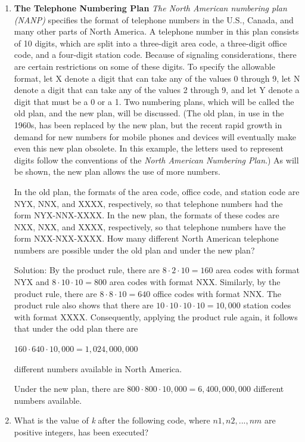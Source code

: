 \documentclass[11pt,a4paper]{book}
\begin{document}
\begin{enumerate}[label=Example~\arabic*]
\item \textbf{The Telephone Numbering Plan} \textit{The North American numbering plan (NANP)} specifies the format of telephone numbers in the U.S., Canada, and many other parts of North America.
A telephone number in this plan consists of 10 digits, which are split into a three-digit area code, a three-digit office code, and a four-digit station code.
Because of signaling considerations, there are certain restrictions on some of these digits.
To specify the allowable format, let X denote a digit that can take any of the values 0 through 9, let N denote a digit that can take any of the values 2 through 9, and let Y denote a digit that must be a 0 or a 1.
Two numbering plans, which will be called the old plan, and the new plan, will be discussed.
(The old plan, in use in the 1960s, has been replaced by the new plan, but the recent rapid growth in demand for new numbers for mobile phones and devices will eventually make even this new plan obsolete.
In this example, the letters used to represent digits follow the conventions of the \textit{North American Numbering Plan}.)
As will be shown, the new plan allows the use of more numbers.

In the old plan, the formats of the area code, office code, and station code are NYX, NNX, and XXXX, respectively, so that telephone numbers had the form NYX-NNX-XXXX.
In the new plan, the formats of these codes are NXX, NXX, and XXXX, respectively, so that telephone numbers have the form NXX-NXX-XXXX. How many different North American telephone numbers are possible under the old plan and under the new plan?

Solution: By the product rule, there are $8 \cdot 2 \cdot 10 = 160$ area codes with format NYX and $8 \cdot 10 \cdot 10 = 800$ area codes with format NXX. 
Similarly, by the product rule, there are $8 \cdot 8 \cdot 10 = 640$ office codes with format NNX.
The product rule also shows that there are $10 \cdot 10 \cdot 10 \cdot 10 = 10,000$ station codes with format XXXX.
Consequently, applying the product rule again, it follows that under the odd plan there are

$160 \cdot 640 \cdot 10,000 = 1,024,000,000$

different numbers available in North America.

Under the new plan, there are
$800 \cdot 800 \cdot 10,000 = 6,400,000,000$
different numbers available.
\newpage
\item What is the value of \emph{k} after the following code, where \textit{$n1, n2, . . . , nm$} are positive integers, has been executed?


\end{enumerate}
\end{document}
